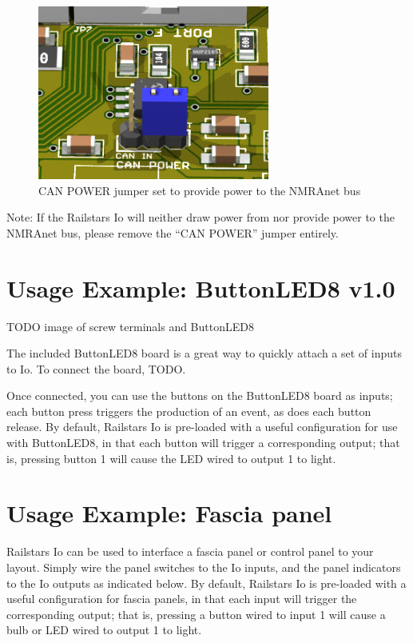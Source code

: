\documentclass[12pt]{book}
\begin{document}
\begin{figure}[htbp]
\begin{center}
\includegraphics[width=3in]{images/IoCANPowerOut.png}
\caption{CAN POWER jumper set to provide power to the NMRAnet bus}
\label{CANOUT}
\end{center}
\end{figure}

Note: If the Railstars Io will neither draw power from nor provide power to the NMRAnet bus, please remove the ``CAN POWER'' jumper entirely.

\section{Usage Example: ButtonLED8 v1.0}

TODO image of screw terminals and ButtonLED8

The included ButtonLED8 board is a great way to quickly attach a set of inputs to Io. To connect the board, TODO.

Once connected, you can use the buttons on the ButtonLED8 board as inputs; each button press triggers the production of an event, as does each button release. By default, Railstars Io is pre-loaded with a useful configuration for use with ButtonLED8, in that each button will trigger a corresponding output; that is, pressing button 1 will cause the LED wired to output 1 to light.

\section{Usage Example: Fascia panel}

Railstars Io can be used to interface a fascia panel or control panel to your layout. Simply wire the panel switches to the Io inputs, and the panel indicators to the Io outputs as indicated below. By default, Railstars Io is pre-loaded with a useful configuration for fascia panels, in that each input will trigger the corresponding output; that is, pressing a button wired to input 1 will cause a bulb or LED wired to output 1 to light.
\end{document}
